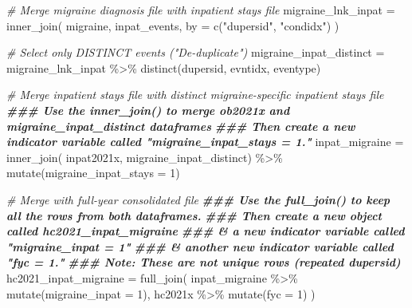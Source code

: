 \documentclass[
]{book}
\newenvironment{Shaded}{\begin{snugshade}}{\end{snugshade}}
\newcommand{\AttributeTok}[1]{\textcolor[rgb]{0.77,0.63,0.00}{#1}}
\newcommand{\CommentTok}[1]{\textcolor[rgb]{0.56,0.35,0.01}{\textit{#1}}}
\newcommand{\DecValTok}[1]{\textcolor[rgb]{0.00,0.00,0.81}{#1}}
\newcommand{\DocumentationTok}[1]{\textcolor[rgb]{0.56,0.35,0.01}{\textbf{\textit{#1}}}}
\newcommand{\FunctionTok}[1]{\textcolor[rgb]{0.00,0.00,0.00}{#1}}
\newcommand{\NormalTok}[1]{#1}
\newcommand{\OtherTok}[1]{\textcolor[rgb]{0.56,0.35,0.01}{#1}}
\newcommand{\SpecialCharTok}[1]{\textcolor[rgb]{0.00,0.00,0.00}{#1}}
\newcommand{\StringTok}[1]{\textcolor[rgb]{0.31,0.60,0.02}{#1}}
\begin{document}
\begin{Shaded}
\begin{Highlighting}[]
\CommentTok{\# Merge migraine diagnosis file with inpatient stays file}
\NormalTok{migraine\_lnk\_inpat }\OtherTok{=} \FunctionTok{inner\_join}\NormalTok{(}
\NormalTok{  migraine, inpat\_events,}
  \AttributeTok{by =} \FunctionTok{c}\NormalTok{(}\StringTok{"dupersid"}\NormalTok{, }\StringTok{"condidx"}\NormalTok{)}
\NormalTok{)}

\CommentTok{\# Select only DISTINCT events ("De{-}duplicate")}
\NormalTok{migraine\_inpat\_distinct }\OtherTok{=}\NormalTok{ migraine\_lnk\_inpat }\SpecialCharTok{\%\textgreater{}\%}
  \FunctionTok{distinct}\NormalTok{(dupersid, evntidx, eventype)}


\CommentTok{\# Merge inpatient stays file with distinct migraine{-}specific inpatient stays file}
\DocumentationTok{\#\#\# Use the inner\_join() to merge ob2021x and migraine\_inpat\_distinct dataframes}
\DocumentationTok{\#\#\# Then create a new indicator variable called "migraine\_inpat\_stays = 1."}
\NormalTok{inpat\_migraine }\OtherTok{=} \FunctionTok{inner\_join}\NormalTok{(}
\NormalTok{  inpat2021x, migraine\_inpat\_distinct) }\SpecialCharTok{\%\textgreater{}\%}
  \FunctionTok{mutate}\NormalTok{(}\AttributeTok{migraine\_inpat\_stays =} \DecValTok{1}\NormalTok{)}


\CommentTok{\# Merge with full{-}year consolidated file}
\DocumentationTok{\#\#\# Use the full\_join() to keep all the rows from both dataframes.}
\DocumentationTok{\#\#\# Then create a new object called hc2021\_inpat\_migraine}
\DocumentationTok{\#\#\# \& a new indicator variable called "migraine\_inpat = 1"}
\DocumentationTok{\#\#\# \& another new indicator variable called "fyc = 1."}
\DocumentationTok{\#\#\# Note: These are not unique rows (repeated dupersid)}
\NormalTok{hc2021\_inpat\_migraine }\OtherTok{=} \FunctionTok{full\_join}\NormalTok{(}
\NormalTok{  inpat\_migraine }\SpecialCharTok{\%\textgreater{}\%} \FunctionTok{mutate}\NormalTok{(}\AttributeTok{migraine\_inpat =} \DecValTok{1}\NormalTok{),}
\NormalTok{  hc2021x }\SpecialCharTok{\%\textgreater{}\%} \FunctionTok{mutate}\NormalTok{(}\AttributeTok{fyc =} \DecValTok{1}\NormalTok{)}
\NormalTok{)}



\end{Highlighting}
\end{Shaded}
\end{document}

